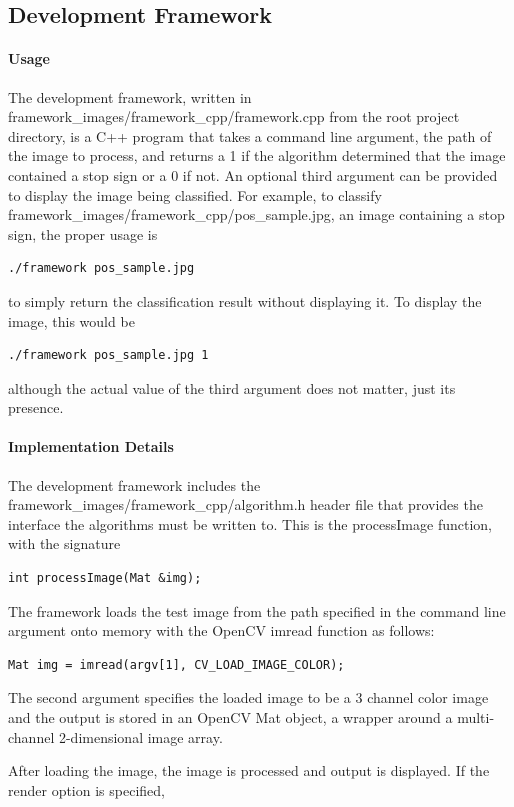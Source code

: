 \documentclass[letterpaper,10pt,titlepage]{article}
\begin{document}
\subsection*{Development Framework}
\paragraph*{Usage}
The development framework, written in
framework\_images/framework\_cpp/framework.cpp from the root project directory,
is a C++ program that takes a command line argument, the path of the image to
process, and returns a 1 if the algorithm determined that the image contained a
stop sign or a 0 if not. An optional third argument can be provided to display
the image being classified. For example, to classify 
framework\_images/framework\_cpp/pos\_sample.jpg, an image containing a stop
sign, the proper usage is
\begin{lstlisting}
./framework pos_sample.jpg
\end{lstlisting}
to simply return the classification result without displaying it. To display
the image, this would be
\begin{lstlisting}
./framework pos_sample.jpg 1
\end{lstlisting}
although the actual value of the third argument does not matter, just its 
presence.
\paragraph*{Implementation Details}
The development framework includes the
framework\_images/framework\_cpp/algorithm.h header file that provides the 
interface the algorithms must be written to. This is the processImage function,
with the signature
\begin{lstlisting}
int processImage(Mat &img);
\end{lstlisting}
The framework loads the test image from the path specified in the command line 
argument onto memory with the OpenCV imread function as follows:
\begin{lstlisting}
Mat img = imread(argv[1], CV_LOAD_IMAGE_COLOR);
\end{lstlisting}
The second argument specifies the loaded image to be a 3 channel color image
and the output is stored in an OpenCV Mat object, a wrapper around a 
multi-channel 2-dimensional image array.

After loading the image, the image is processed and output is displayed. If
the render option is specified, 
\end{document}
